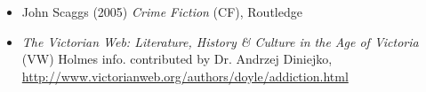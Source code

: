 \documentclass[a4paper,landscape,headrule,footrule,xetex]{foils}
\begin{document}


























  \begin{itemize}
  \item   John Scaggs (2005) \textit{Crime Fiction} (CF), Routledge
  \item \textit{The Victorian Web: Literature, History \& Culture in
the Age of Victoria} (VW) Holmes info. contributed by Dr.
Andrzej Diniejko,
\url{http://www.victorianweb.org/authors/doyle/addiction.html}
  \end{itemize}
\end{document}
